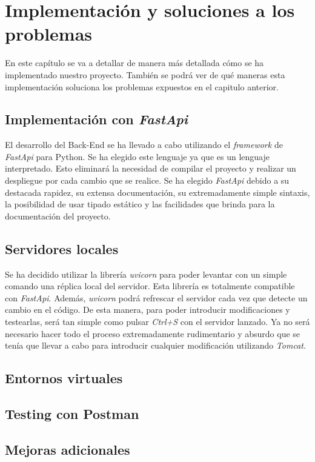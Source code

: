 \documentclass[12pt]{report}
\begin{document}
\chapter{Implementación y soluciones a los problemas}
En este capítulo se va a detallar de manera más detallada cómo se ha implementado nuestro proyecto. También se podrá ver de qué maneras esta implementación soluciona los problemas expuestos en el capitulo anterior. 
\section{Implementación con \textit{FastApi}}
El desarrollo del Back-End se ha llevado a cabo utilizando el \textit{framework} de \textit{FastApi} para Python. Se ha elegido este lenguaje ya que es un lenguaje interpretado. Esto eliminará la necesidad de compilar el proyecto y realizar un despliegue por cada cambio que se realice.
Se ha elegido \textit{FastApi} debido a su destacada rapidez, su extensa documentación, su extremadamente simple sintaxis, la posibilidad de usar tipado estático y las facilidades que brinda para la documentación del proyecto.
\section{Servidores locales}
Se ha decidido utilizar la librería \textit{uvicorn} para poder levantar con un simple comando una réplica local del servidor. Esta librería es totalmente compatible con \textit{FastApi}. Además, \textit{uvicorn} podrá refrescar el servidor cada vez que detecte un cambio en el código. De esta manera, para poder introducir modificaciones y testearlas, será tan simple como pulsar \textit{Ctrl+S} con el servidor lanzado. Ya no será necesario hacer todo el proceso extremadamente rudimentario y absurdo que se tenía que llevar a cabo para introducir cualquier modificación utilizando \textit{Tomcat}.
\section{Entornos virtuales}%


\section{Testing con Postman} %
\section{Mejoras adicionales} %
\end{document}
